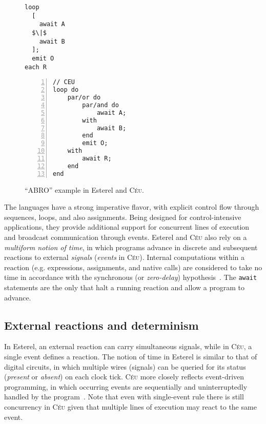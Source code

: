 \documentclass{acm_proc_article-sp}
\newcommand{\CEU}{\textsc{C\'{e}u}\xspace}
\newcommand{\code}[1] {{\small{\texttt{#1}}}}
\newcommand{\1}{\;}
\newcommand{\2}{\;\;}
\newcommand{\3}{\;\;\;}
\newcommand{\5}{\;\;\;\;\;}
\begin{document}
\begin{figure}[t]
\begin{minipage}[t]{0.45\linewidth}
\begin{lstlisting}[mathescape=true]
% ESTEREL
loop
  [
    await A
  $\|$
    await B
  ];
  emit O
each R
\end{lstlisting}
\end{minipage}
%
\begin{minipage}[t]{0.45\linewidth}
\begin{lstlisting}[numbers=left,xleftmargin=0.5em]
// CEU
loop do
    par/or do
        par/and do
            await A;
        with
            await B;
        end
        emit O;
    with
        await R;
    end
end
\end{lstlisting}
\end{minipage}
\caption{ ``ABRO'' example in Esterel and \CEU. %
{\small
}
\label{lst.abro}
}
\end{figure}

The languages have a strong imperative flavor, with explicit control flow 
through sequences, loops, and also assignments.
Being designed for control-intensive applications, they provide additional 
support for concurrent lines of execution and broadcast communication through 
events.
%
Esterel and \CEU also rely on a \emph{multiform notion of time}, in which 
programs advance in discrete and subsequent reactions to external 
\emph{signals} (\emph{events} in \CEU).
Internal computations within a reaction (e.g. expressions, assignments, and 
native calls) are considered to take no time in accordance with the synchronous 
(or \emph{zero-delay}) hypothesis~\cite{rp.hypothesis}.
The \code{await} statements are the only that halt a running reaction and allow 
a program to advance.


\subsection{External reactions and determinism}

In Esterel, an external reaction can carry simultaneous signals, while in \CEU, 
a single event defines a reaction.
%
The notion of time in Esterel is similar to that of digital circuits, in which 
multiple wires (signals) can be queried for its status (\emph{present} or 
\emph{absent}) on each clock tick.
%
\CEU more closely reflects event-driven programming, in which occurring events 
are sequentially and uninterruptedly handled by the program~\cite{EVT1,EVT2}.
%
Note that even with single-event rule there is still concurrency in \CEU given 
that multiple lines of execution may react to the same event.
\end{document}
